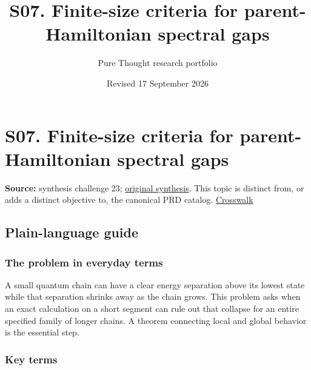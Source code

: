 \documentclass[
  11pt,
]{article}
\title{S07. Finite-size criteria for parent-Hamiltonian spectral gaps}
\author{Pure Thought research portfolio}
\date{Revised 17 September 2026}
\begin{document}
\maketitle
\thispagestyle{empty}
\clearpage

\section{S07. Finite-size criteria for parent-Hamiltonian spectral gaps}

\textbf{Source:} synthesis challenge 23;
\href{https://github.com/rick-stevens-ai/Pure-Thought/blob/main/NOTES/30-Most-Compelling-Pure-Thought-AI-Challenges.md}{original
synthesis}. This topic is distinct from, or adds a distinct objective
to, the canonical PRD catalog.
\href{https://github.com/rick-stevens-ai/Pure-Thought/blob/main/reviews/SYNTHESIS-CROSSWALK.md}{Crosswalk}

\subsection{Plain-language guide}

\subsubsection{The problem in everyday terms}

A small quantum chain can have a clear energy separation above its
lowest state while that separation shrinks away as the chain grows. This
problem asks when an exact calculation on a short segment can rule out
that collapse for an entire specified family of longer chains. A theorem
connecting local and global behavior is the essential step.

\subsubsection{Key terms}
\end{document}
